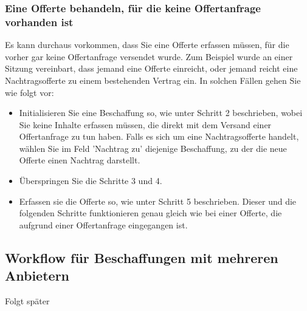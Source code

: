\subsubsection{Eine Offerte behandeln, für die keine Offertanfrage vorhanden ist}

Es kann durchaus vorkommen, dass Sie eine Offerte erfassen müssen, für die vorher gar keine Offertanfrage versendet wurde. Zum Beispiel wurde an einer Sitzung vereinbart, dass jemand eine Offerte einreicht, oder jemand reicht eine Nachtragsofferte zu einem bestehenden Vertrag ein. In solchen Fällen gehen Sie wie folgt vor:


\begin{itemize}
\item
Initialisieren Sie eine Beschaffung so, wie unter Schritt 2 beschrieben, wobei Sie keine Inhalte erfassen müssen, die direkt mit dem Versand einer Offertanfrage zu tun haben. Falls es sich um eine Nachtragsofferte handelt, wählen Sie im Feld 'Nachtrag zu' diejenige Beschaffung, zu der die neue Offerte einen Nachtrag darstellt.
\item
Überspringen Sie die Schritte 3 und 4.
\item
Erfassen sie die Offerte so, wie unter Schritt 5 beschrieben. Dieser und die folgenden Schritte funktionieren genau gleich wie bei einer Offerte, die aufgrund einer Offertanfrage eingegangen ist.
\end{itemize}

\subsection{Workflow für Beschaffungen mit mehreren Anbietern}

Folgt später

